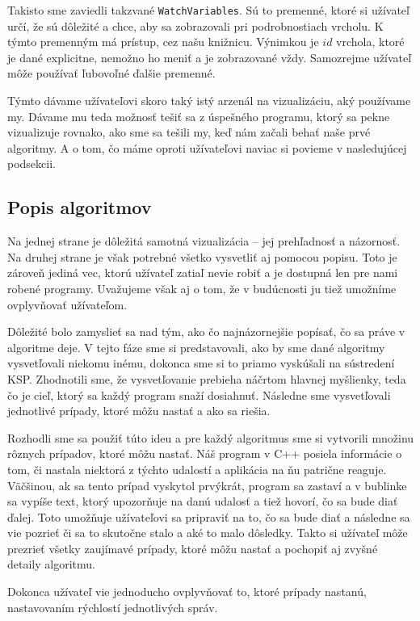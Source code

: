 Takisto sme zaviedli takzvané \verb!WatchVariables!. Sú to premenné, ktoré si užívateľ určí, že sú
dôležité a chce, aby sa zobrazovali pri podrobnostiach vrcholu. K týmto premenným má
prístup, cez našu knižnicu. Výnimkou je $id$ vrchola, ktoré je dané explicitne, nemožno ho
meniť a je zobrazované vždy. Samozrejme užívateľ môže používať ľubovoľné ďalšie premenné.

Týmto dávame užívateľovi skoro taký istý arzenál na vizualizáciu, aký používame my. Dávame mu teda
možnosť tešiť sa z úspešného programu, ktorý sa pekne vizualizuje rovnako, ako sme sa tešili my, keď
nám začali behať naše prvé algoritmy. A o tom, čo máme oproti užívateľovi naviac si povieme v
nasledujúcej podsekcii.

\subsection{Popis algoritmov}

Na jednej strane je dôležitá samotná vizualizácia -- jej prehľadnosť a názornosť. Na druhej strane
je však potrebné všetko vysvetliť aj pomocou popisu. Toto je zároveň jediná vec, ktorú užívateľ
zatiaľ nevie robiť a je dostupná len pre nami robené programy. Uvažujeme však aj o tom, že v budúcnosti
ju tiež umožníme ovplyvňovať užívateľom.

Dôležité bolo zamyslieť sa nad tým, ako čo najnázornejšie popísať, čo sa práve v algoritme deje.
V tejto fáze sme si predstavovali, ako by sme dané algoritmy vysvetľovali niekomu inému, dokonca sme si to priamo
vyskúšali na sústredení KSP. Zhodnotili sme, že vysvetľovanie prebieha náčrtom hlavnej myšlienky,
teda čo je cieľ, ktorý sa každý program snaží dosiahnuť. Následne sme vysvetľovali jednotlivé prípady, ktoré
môžu nastať a ako sa riešia.

Rozhodli sme sa použiť túto ideu a pre každý algoritmus sme si vytvorili množinu rôznych prípadov,
ktoré môžu nastať. Náš program v C++ posiela informácie o tom, či nastala niektorá z týchto udalostí
a aplikácia na ňu patrične reaguje. Väčšinou, ak sa tento prípad vyskytol prvýkrát, program sa
zastaví a v bublinke sa vypíše text, ktorý upozorňuje na danú udalosť a tiež hovorí, čo sa bude
diať ďalej. Toto umožňuje užívateľovi sa pripraviť na to, čo sa bude diať a následne sa vie pozrieť
či sa to skutočne stalo a aké to malo dôsledky. Takto si užívateľ môže prezrieť všetky zaujímavé
prípady, ktoré môžu nastať a pochopiť aj zvyšné detaily algoritmu.

Dokonca užívateľ vie jednoducho ovplyvňovať to, ktoré prípady nastanú, nastavovaním rýchlostí
jednotlivých správ.

